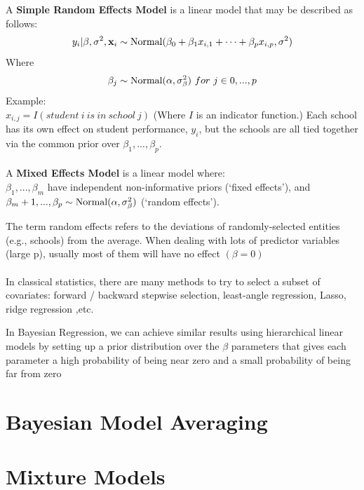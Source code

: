 \documentclass[12pt]{book}
\begin{document}
A \textbf{Simple Random Effects Model} is a linear model that may be described as follows:
\begin{equation}
y_i|\beta, \sigma^2, \textbf{x}_i \sim \textnormal{Normal}(\beta_0 + \beta_{1} x_{i,1} + \dots + \beta_{p} x_{i,p}, \sigma^2 )
\end{equation}
Where
\begin{equation}
\beta_j \sim \textnormal{Normal}(\alpha, \sigma^2_\beta) \ for \ j \in 0, ... , p
\end{equation}
Example: \\
$x_{i,j} = I(student \ i \ is \ in \ school \ j)$
(Where $I$ is an indicator function.) Each school has its own effect on student performance, $y_i$, but the schools are all tied together via the common prior over $\beta_1, ..., \beta_p$.
\\\\
A \textbf{Mixed Effects Model} is a linear model where: \\
\hspace{10 mm} $\beta_1, ..., \beta_m$ have independent non-informative priors (`fixed effects'), and \\
\hspace{10 mm} $\beta_m+1, ..., \beta_p  \sim \textnormal{Normal}(\alpha, \sigma^2_\beta)$ (`random effects').

The term random effects refers to the deviations of randomly-selected entities (e.g., schools) from the average.
When dealing with lots of predictor variables (large p), usually
most of them will have no effect $(\beta = 0)$
\\\\
In classical statistics, there are many methods to try to select a
subset of covariates: forward / backward stepwise selection,
least-angle regression, Lasso, ridge regression ,etc.

In Bayesian Regression, we can achieve similar results using
hierarchical linear models by setting up a prior distribution over the
$\beta$ parameters that gives each parameter a high probability of being near zero and a small probability of being far from zero


\chapter{Bayesian Model Averaging}
\chapter{Mixture Models} 
\end{document}
